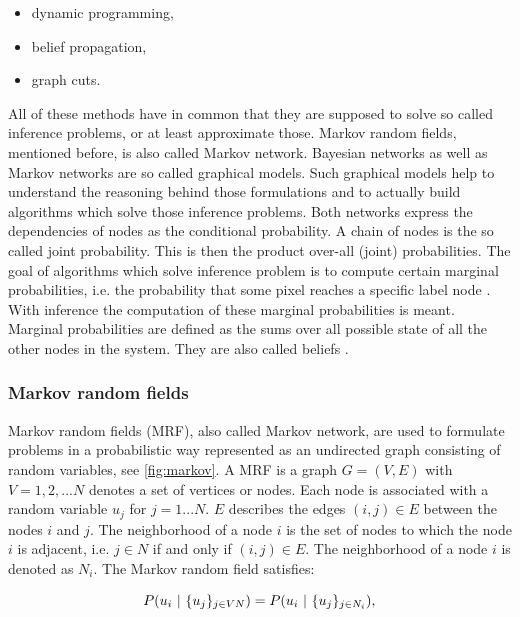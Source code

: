 \begin{itemize}
  \item dynamic programming,
  \item belief propagation,
  \item graph cuts.
\end{itemize}

\noindent All of these methods have in common that they are supposed to solve so called inference problems, or at least approximate those.
Markov random fields, mentioned before, is also called Markov network.
Bayesian networks as well as Markov networks are so called graphical models.
Such graphical models help to understand the reasoning behind those formulations and to actually build algorithms which solve those inference problems.
Both networks express the dependencies of nodes as the conditional probability.
A chain of nodes is the so called joint probability.
This is then the product over-all (joint) probabilities.
The goal of algorithms which solve inference problem is to compute certain marginal probabilities, i.e. the probability that some pixel reaches a specific label node \citep{cyganek2011introduction}.
With inference the computation of these marginal probabilities is meant.
Marginal probabilities are defined as the sums over all possible state of all the other nodes in the system.
They are also called beliefs \citep{yedidia2003understanding}.

\subsubsection{Markov random fields}


Markov random fields (MRF), also called Markov network, are used to formulate problems in a probabilistic way represented as an undirected graph consisting of random variables, see \ref{fig:markov}.
A MRF is a graph $G = (V, E)$ with $V = {1,2,...N}$ denotes a set of vertices or nodes.
Each node is associated with a random variable $u_j$ for $j = 1...N$.
$E$ describes the edges $(i,j) \in E$ between the nodes $i$ and $j$.
The neighborhood of a node $i$ is the set of nodes to which the node $i$ is adjacent, i.e. $j \in N$ if and only if $(i,j) \in E$.
The neighborhood of a node $i$ is denoted as $N_i$.
The Markov random field satisfies:

\begin{equation}
  P(u_i\ |\ \{u_j\}_{j \in V\\N}) = P(u_i\ |\ \{u_j\}_{j \in N_i}),
\end{equation}

